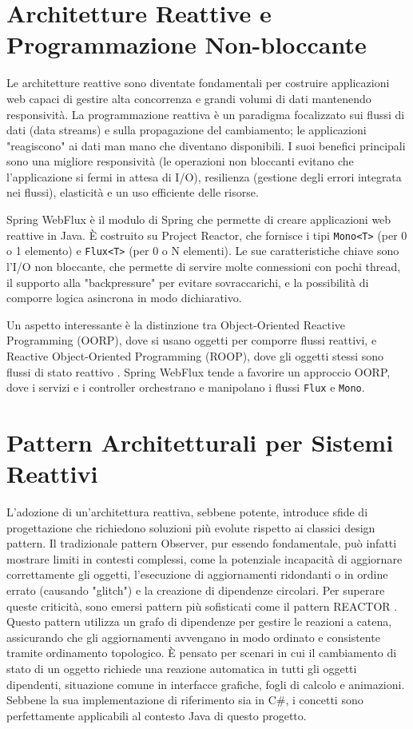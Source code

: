 \documentclass[12pt,a4paper,openright,twoside]{book}
\begin{document}
\section{Architetture Reattive e Programmazione Non-bloccante}
\label{sec:architetture_reattive}

Le architetture reattive sono diventate fondamentali per costruire applicazioni web capaci di gestire alta concorrenza e grandi volumi di dati mantenendo responsività. La programmazione reattiva è un paradigma focalizzato sui flussi di dati (data streams) e sulla propagazione del cambiamento; le applicazioni "reagiscono" ai dati man mano che diventano disponibili. I suoi benefici principali sono una migliore responsività (le operazioni non bloccanti evitano che l'applicazione si fermi in attesa di I/O), resilienza (gestione degli errori integrata nei flussi), elasticità e un uso efficiente delle risorse.

Spring WebFlux è il modulo di Spring che permette di creare applicazioni web reattive in Java. È costruito su Project Reactor, che fornisce i tipi \texttt{Mono<T>} (per 0 o 1 elemento) e \texttt{Flux<T>} (per 0 o N elementi). Le sue caratteristiche chiave sono l'I/O non bloccante, che permette di servire molte connessioni con pochi thread, il supporto alla "backpressure" per evitare sovraccarichi, e la possibilità di comporre logica asincrona in modo dichiarativo.

Un aspetto interessante è la distinzione tra Object-Oriented Reactive Programming (OORP), dove si usano oggetti per comporre flussi reattivi, e Reactive Object-Oriented Programming (ROOP), dove gli oggetti stessi sono flussi di stato reattivo \cite{Boix2013OORP}. Spring WebFlux tende a favorire un approccio OORP, dove i servizi e i controller orchestrano e manipolano i flussi \texttt{Flux} e \texttt{Mono}.

\section{Pattern Architetturali per Sistemi Reattivi}
\label{sec:pattern_reattivi}

L'adozione di un'architettura reattiva, sebbene potente, introduce sfide di progettazione che richiedono soluzioni più evolute rispetto ai classici design pattern. Il tradizionale pattern Observer, pur essendo fondamentale, può infatti mostrare limiti in contesti complessi, come la potenziale incapacità di aggiornare correttamente gli oggetti, l'esecuzione di aggiornamenti ridondanti o in ordine errato (causando "glitch") e la creazione di dipendenze circolari. Per superare queste criticità, sono emersi pattern più sofisticati come il pattern REACTOR \cite{Mijac2021Reactor}. Questo pattern utilizza un grafo di dipendenze per gestire le reazioni a catena, assicurando che gli aggiornamenti avvengano in modo ordinato e consistente tramite ordinamento topologico. È pensato per scenari in cui il cambiamento di stato di un oggetto richiede una reazione automatica in tutti gli oggetti dipendenti, situazione comune in interfacce grafiche, fogli di calcolo e animazioni. Sebbene la sua implementazione di riferimento sia in C\#, i concetti sono perfettamente applicabili al contesto Java di questo progetto.
\end{document}
